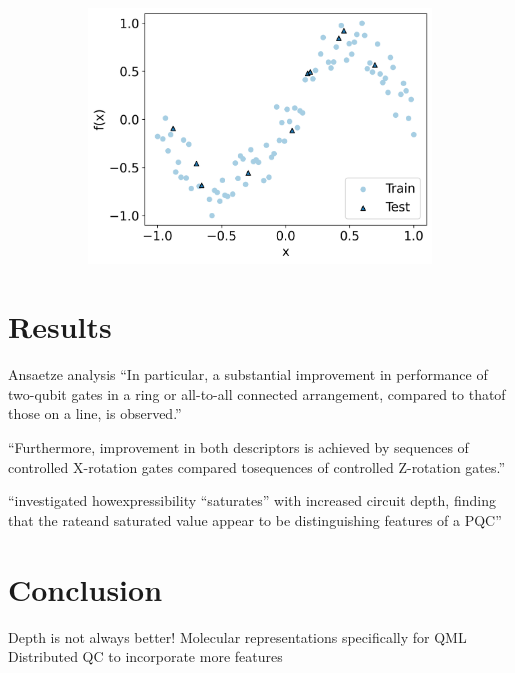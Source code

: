 \documentclass[journal=jacsat,manuscript=article]{achemso}
\begin{document}
\begin{figure}[H]
\begin{subfigure}[b]{0.3\textwidth}
		\centering
		\includegraphics[width=\textwidth]{images/Function_Fitting/function_dataset/sine_train_vs_test.png}
		\caption{}
		\label{fig:sine_train_vs_test}
	\end{subfigure}
	\caption{}
	\label{fig:train_vs_test}
\end{figure}

\section{Results}


Ansaetze analysis \cite{sim_expressibility_2019}
``In particular, a substantial improvement in performance of two-qubit gates in a ring or all-to-all connected arrangement, compared to thatof those on a line, is observed.''

``Furthermore, improvement in both descriptors is achieved by sequences of controlled X-rotation gates compared tosequences of controlled Z-rotation gates.''

``investigated howexpressibility “saturates” with increased circuit depth, finding that the rateand saturated value appear to be distinguishing features of a PQC''



\section{Conclusion}
Depth is not always better!
Molecular representations specifically for QML
Distributed QC to incorporate more features


\end{document}
